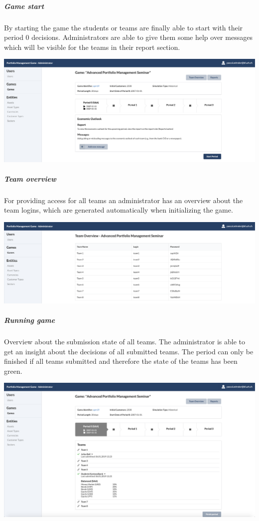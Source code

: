 \subparagraph{Game start}
By starting the game the students or teams are finally able to start with their period 0 decisions. Administrators are able to give them some help over messages which will be visible for the teams in their report section.
\begin{center}
  \includegraphics[scale=0.2]{img/application-overview/administrator/05_game_start.png}
\end{center}

\subparagraph{Team overview}
For providing access for all teams an administrator has an overview about the team logins, which are generated automatically when initializing the game.
\begin{center}
  \includegraphics[scale=0.2]{img/application-overview/administrator/06_team_login_overview.png}
\end{center}

\subparagraph{Running game}
Overview about the submission state of all teams. The administrator is able to get an insight about the decisions of all submitted teams. The period can only be finished if all teams submitted and therefore the state of the teams has been green.
\begin{center}
  \includegraphics[scale=0.2]{img/application-overview/administrator/07_running_game.png}
\end{center}

